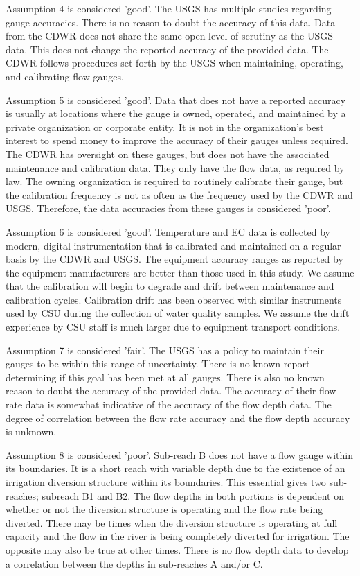 \begin{linenumbers}[1]
Assumption 4 is considered 'good'.  The USGS has multiple studies regarding gauge accuracies.  There is no reason to doubt the accuracy of this data.  Data from the CDWR does not share the same open level of scrutiny as the USGS data.  This does not change the reported accuracy of the provided data.  The CDWR follows procedures set forth by the USGS when maintaining, operating, and calibrating flow gauges.

Assumption 5 is considered 'good'.  Data that does not have a reported accuracy is usually at locations where the gauge is owned, operated, and maintained by a private organization or corporate entity.  It is not in the organization's best interest to spend money to improve the accuracy of their gauges unless required.  The CDWR has oversight on these gauges, but does not have the associated maintenance and calibration data.  They only have the flow data, as required by law.  The owning organization is required to routinely calibrate their gauge, but the calibration frequency is not as often as the frequency used by the CDWR and USGS.  Therefore, the data accuracies from these gauges is considered 'poor'.

Assumption 6 is considered 'good'.  Temperature and EC data is collected by modern, digital instrumentation that is calibrated and maintained on a regular basis by the CDWR and USGS.  The equipment accuracy ranges as reported by the equipment manufacturers are better than those used in this study.  We assume that the calibration will begin to degrade and drift between maintenance and calibration cycles.  Calibration drift has been observed with similar instruments used by CSU during the collection of water quality samples.  We assume the drift experience by CSU staff is much larger due to equipment transport conditions.

Assumption 7 is considered 'fair'.  The USGS has a policy to maintain their gauges to be within this range of uncertainty.  There is no known report determining if this goal has been met at all gauges.  There is also no known reason to doubt the accuracy of the provided data.  The accuracy of their flow rate data is somewhat indicative of the accuracy of the flow depth data.  The degree of correlation between the flow rate accuracy and the flow depth accuracy is unknown.

Assumption 8 is considered 'poor'.  Sub-reach B does not have a flow gauge within its boundaries.  It is a short reach with variable depth due to the existence of an irrigation diversion structure within its boundaries.  This essential gives two sub-reaches; subreach B1 and B2.  The flow depths in both portions is dependent on whether or not the diversion structure is operating and the flow rate being diverted.  There may be times when the diversion structure is operating at full capacity and the flow in the river is being completely diverted for irrigation.  The opposite may also be true at other times.  There is no flow depth data to develop a correlation between the depths in sub-reaches A and/or C.


\end{linenumbers}
